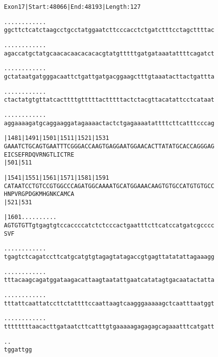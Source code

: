 \documentclass{article}
\begin{document}
\begin{alltt}
Exon 17 | Start: 48066 | End: 48193 | Length: 127

.    .    .    .    .    .    .    .    .    .    .    .
ggcttctcatctaagcctgcctatggaatcttcccacctctgatctttcctagcttttac



.    .    .    .    .    .    .    .    .    .    .    .
agaccatgctatgcaacacaacacacacgtatgtttttgatgataaatattttcagatct



.    .    .    .    .    .    .    .    .    .    .    .
gctataatgatgggacaattctgattgatgacggaagctttgtaaatacttactgattta



.    .    .    .    .    .    .    .    .    .    .    .
ctactatgtgttatcacttttgtttttactttttactctacgttacatattcctcataat



.    .    .    .    .    .    .    .    .    .    .    .
aggaaaagatgcaggaaggatagaaaactactctgagaaaatattttcttcatttcccag



 |1481     |1491     |1501     |1511     |1521     |1531
GAAATCTGCAGTGAATTTCGGGACCAAGTGAGGAATGGAACACTTATATGCACCAGGGAG
E  I  C  S  E  F  R  D  Q  V  R  N  G  T  L  I  C  T  R  E
                     |501                          |511

 |1541     |1551     |1561     |1571     |1581     |1591
CATAATCCTGTCCGTGGCCCAGATGGCAAAATGCATGGAAACAAGTGTGCCATGTGTGCC
H  N  P  V  R  G  P  D  G  K  M  H  G  N  K  C  A  M  C  A
                     |521                          |531

 |1601      .    .    .    .    .    .    .    .    .    .
AGTGTGTTgtgagtgtccaccccatctctcccactgaatttcttcatccatgatcgcccc
S  V  F


\end{alltt}
\newpage
\begin{alltt}
  .    .    .    .    .    .    .    .    .    .    .    .
tgagtctcagatccttcatgcatgtgtagagtatagaccgtgagttatatattagaaagg



  .    .    .    .    .    .    .    .    .    .    .    .
tttacaagcagatggataagacattaagtaatattgaatcatatagtgacaatactatta



  .    .    .    .    .    .    .    .    .    .    .    .
tttattcaattatccttctattttccaattaagtcaagggaaaaagctcaatttaatggt



  .    .    .    .    .    .    .    .    .    .    .    .
ttttttttaacacttgataatcttcatttgtgaaaaagagagagcagaaatttcatgatt



  .    .
tggattgg


\end{alltt}
\end{document}
